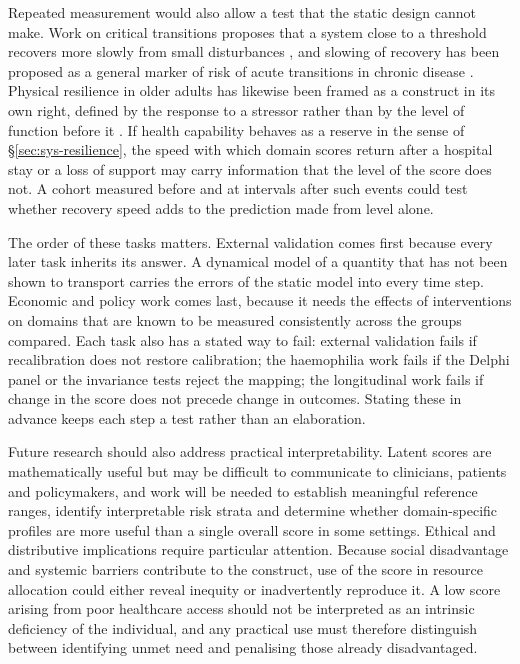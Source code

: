Repeated measurement would also allow a test that the static design cannot make.
Work on critical transitions proposes that a system close to a threshold
recovers more slowly from small disturbances \citep{scheffer_2009}, and slowing
of recovery has been proposed as a general marker of risk of acute transitions
in chronic disease \citep{olde_rikkert_2016}. Physical resilience in older
adults has likewise been framed as a construct in its own right, defined by the
response to a stressor rather than by the level of function before it
\citep{whitson_2016}. If health capability behaves as a reserve in the sense of
\S\ref{sec:sys-resilience}, the speed with which domain scores return after a
hospital stay or a loss of support may carry information that the level of the
score does not. A cohort measured before and at intervals after such events
could test whether recovery speed adds to the prediction made from level alone.

The order of these tasks matters. External validation comes first because every
later task inherits its answer. A dynamical model of a quantity that has not
been shown to transport carries the errors of the static model into every time
step. Economic and policy work comes last, because it needs the effects of
interventions on domains that are known to be measured consistently across the
groups compared. Each task also has a stated way to fail: external
validation fails if recalibration does not restore calibration; the haemophilia
work fails if the Delphi panel or the invariance tests reject the mapping; the
longitudinal work fails if change in the score does not precede change in
outcomes. Stating these in advance keeps each step a test rather than an
elaboration.

Future research should also address practical interpretability. Latent scores are mathematically useful but may be difficult to communicate to clinicians, patients and policymakers, and work will be needed to establish meaningful reference ranges, identify interpretable risk strata and determine whether domain-specific profiles are more useful than a single overall score in some settings. Ethical and distributive implications require particular attention. Because social disadvantage and systemic barriers contribute to the construct, use of the score in resource allocation could either reveal inequity or inadvertently reproduce it. A low score arising from poor healthcare access should not be interpreted as an intrinsic deficiency of the individual, and any practical use must therefore distinguish between identifying unmet need and penalising those already disadvantaged.

